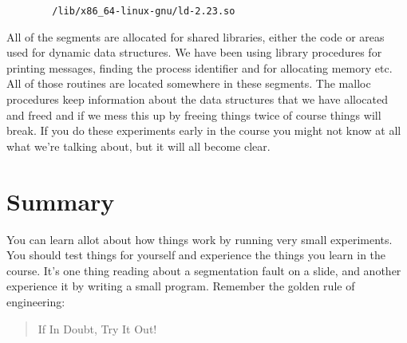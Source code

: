 \documentclass[a4paper,11pt]{article}
\begin{document}
\begin{verbatim}
        /lib/x86_64-linux-gnu/ld-2.23.so
\end{verbatim}

All of the segments are allocated for shared libraries, either the code
or areas used for dynamic data structures. We have been using library
procedures for printing messages, finding the process identifier and
for allocating memory etc. All of those routines are located somewhere
in these segments. The malloc procedures keep information about the
data structures that we have allocated and freed and if we mess this
up by freeing things twice of course things will break. If you do
these experiments early in the course you might not know at all what
we're talking about, but it will all become clear.

\section{Summary}

You can learn allot about how things work by running very small
experiments. You should test things for yourself and experience the
things you learn in the course. It's one thing reading about a
segmentation fault on a slide, and another experience it by writing 
a small program. Remember the golden rule of engineering:

\begin{quote}
If In Doubt, Try It Out! 
\end{quote}
\end{document}
